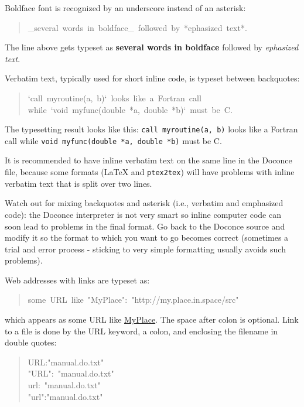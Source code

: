 \documentclass[a4paper,english]{article}
\begin{document}
Boldface font is recognized by an underscore instead of an asterisk:
%
\begin{quote}{\ttfamily \raggedright \noindent
\_several~words~in~boldface\_~followed~by~*ephasized~text*.
}
\end{quote}

The line above gets typeset as
\textbf{several words in boldface} followed by \emph{ephasized text}.

Verbatim text, typically used for short inline code,
is typeset between backquotes:
%
\begin{quote}{\ttfamily \raggedright \noindent
`call~myroutine(a,~b)`~looks~like~a~Fortran~call\\
while~`void~myfunc(double~*a,~double~*b)`~must~be~C.
}
\end{quote}

The typesetting result looks like this:
\texttt{call myroutine(a, b)} looks like a Fortran call
while \texttt{void myfunc(double *a, double *b)} must be C.

It is recommended to have inline verbatim text on the same line in
the Doconce file, because some formats (LaTeX and \texttt{ptex2tex}) will have
problems with inline verbatim text that is split over two lines.

Watch out for mixing backquotes and asterisk (i.e., verbatim and
emphasized code): the Doconce interpreter is not very smart so inline
computer code can soon lead to problems in the final format. Go back to the
Doconce source and modify it so the format to which you want to go
becomes correct (sometimes a trial and error process - sticking to
very simple formatting usually avoids such problems).

Web addresses with links are typeset as:
%
\begin{quote}{\ttfamily \raggedright \noindent
some~URL~like~"MyPlace":~"http://my.place.in.space/src"
}
\end{quote}

which appears as some URL like \href{http://my.place.in.space/src}{MyPlace}.
The space after colon is optional.
Link to a file is done by the URL keyword, a colon, and enclosing the
filename in double quotes:
%
\begin{quote}{\ttfamily \raggedright \noindent
URL:"manual.do.txt"\\
"URL":~"manual.do.txt"\\
url:~"manual.do.txt"\\
"url":"manual.do.txt"
}
\end{quote}
\end{document}
